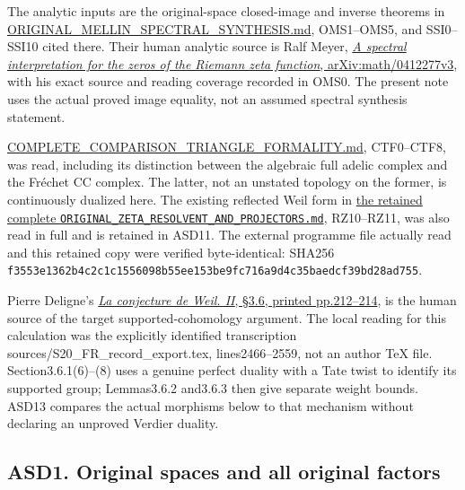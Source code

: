 The analytic inputs are the original-space closed-image and inverse
theorems in \url{ORIGINAL_MELLIN_SPECTRAL_SYNTHESIS.md}, OMS1--OMS5, and
SSI0--SSI10 cited there. Their human analytic source is Ralf Meyer,
\href{https://arxiv.org/abs/math/0412277v3}{\emph{A spectral
interpretation for the zeros of the Riemann zeta function},
arXiv:math/0412277v3}, with his exact source and reading coverage
recorded in OMS0. The present note uses the actual proved image
equality, not an assumed spectral synthesis statement.

\url{COMPLETE_COMPARISON_TRIANGLE_FORMALITY.md}, CTF0--CTF8, was read,
including its distinction between the algebraic full adelic complex and
the Fréchet CC complex. The latter, not an unstated topology on the
former, is continuously dualized here. The existing reflected Weil form
in
\href{https://github.com/KokunoYumeto/zeta-function-research-reader/blob/main/workbenches/splitzero-tandem/continuations/20260924-cohomology-weight-and-character-lifts/gct-weight-control/proofs/ORIGINAL_ZETA_RESOLVENT_AND_PROJECTORS.md}{the
retained complete \nolinkurl{ORIGINAL_ZETA_RESOLVENT_AND_PROJECTORS.md}},
RZ10--RZ11, was also read in full and is retained in ASD11. The external
programme file actually read and this retained copy were verified
byte-identical: SHA256
\nolinkurl{f3553e1362b4c2c1c1556098b55ee153be9fc716a9d4c35baedcf39bd28ad755}.

Pierre Deligne's
\href{https://www.numdam.org/item/PMIHES_1980__52__137_0/}{\emph{La
conjecture de Weil. II}, §3.6, printed pp.212--214}, is the human source
of the target supported-cohomology argument. The local reading for this
calculation was the explicitly identified transcription
sources/S20\_FR\_record\_export.tex, lines2466--2559, not an author TeX
file. Section3.6.1(6)--(8) uses a genuine perfect duality with a Tate
twist to identify its supported group; Lemmas3.6.2 and3.6.3 then give
separate weight bounds. ASD13 compares the actual morphisms below to
that mechanism without declaring an unproved Verdier duality.

\subsection{ASD1. Original spaces and all original
factors}\label{asd1.-original-spaces-and-all-original-factors}


